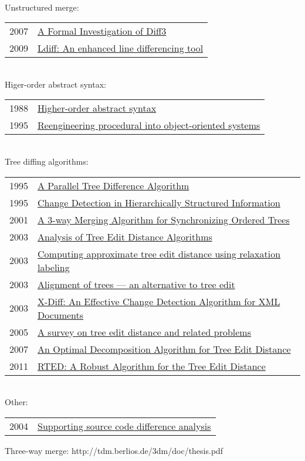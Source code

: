 \documentclass[12pt]{article}
\begin{document}
\\
Unstructured merge: \\
\begin{tabular}{ | l | l | }
	2007 & \href{http://www.cis.upenn.edu/~bcpierce/papers/diff3-short.pdf}{A Formal Investigation of Diff3 } \\
	2009 & \href{http://ieeexplore.ieee.org/xpl/articleDetails.jsp?tp=&arnumber=5070564}{Ldiff: An enhanced line differencing tool } \\
\end{tabular}
\\
Higer-order abstract syntax: \\
\begin{tabular}{ | l | l | }
	1988 & \href{http://dl.acm.org/citation.cfm?id=54010}{Higher-order abstract syntax} \\
	1995 & \href{http://ieeexplore.ieee.org/xpls/abs_all.jsp?arnumber=514712&tag=1}{Reengineering procedural into object-oriented systems} \\	
\end{tabular}
\\
Tree diffing algorithms: \\
\begin{tabular}{ | l | l | }
	1995 & \href{http://citeseerx.ist.psu.edu/viewdoc/summary?doi=10.1.1.48.8675}{A Parallel Tree Difference Algorithm } \\
	1995 & \href{http://ilpubs.stanford.edu:8090/115/1/1995-46.pdf}{Change Detection in Hierarchically Structured Information} \\
	2001 & \href{http://tdm.berlios.de/3dm/doc/thesis.pdf}{A 3-way Merging Algorithm for Synchronizing Ordered Trees} \\
	2003 & \href{http://www.lifl.fr/~touzet/Publications/cpm03.pdf}{Analysis of Tree Edit Distance Algorithms} \\
	2003 & \href{http://www.sciencedirect.com/science/article/pii/S0167865502002556}{Computing approximate tree edit distance using relaxation labeling} \\
	2003 & \href{http://www.sciencedirect.com/science/article/pii/0304397595800299}{Alignment of trees — an alternative to tree edit} \\
	2003 & \href{http://ieeexplore.ieee.org/xpls/abs_all.jsp?arnumber=1260818}{X-Diff: An Effective Change Detection Algorithm for XML Documents} \\
	2005 & \href{http://citeseerx.ist.psu.edu/viewdoc/summary?doi=10.1.1.100.2577}{A survey on tree edit distance and related problems } \\
	2007 & \href{http://link.springer.com/chapter/10.1007\%2F978-3-540-73420-8_15?LI=true}{An Optimal Decomposition Algorithm for Tree Edit Distance}  \\ %
	2011 & \href{http://arxiv.org/abs/1201.0230}{RTED: A Robust Algorithm for the Tree Edit Distance}
\end{tabular}
\\
Other: \\
\begin{tabular}{ | l | l | }
	2004 & \href{http://ieeexplore.ieee.org/xpls/abs_all.jsp?arnumber=1357805}{Supporting source code difference analysis } \\
\end{tabular}

Three-way merge:
http://tdm.berlios.de/3dm/doc/thesis.pdf






\end{document}
